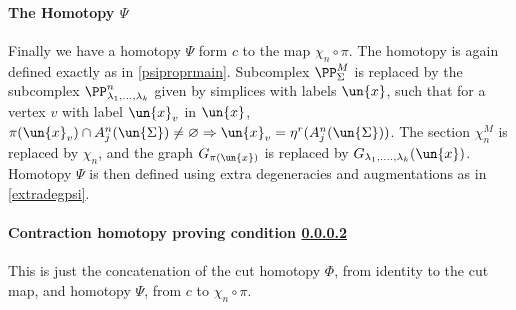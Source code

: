 \documentclass[a4paper,10pt]{amsart}
\begin{document}
%

	\paragraph{\textbf{The Homotopy $\Psi$}} 
	Finally we have a homotopy $\Psi$ form $c$ to the map $\chi_n \circ \pi$. The homotopy is again defined exactly as in \ref{psiproprmain}. Subcomplex $\PP_{\Sigma}^M$ is replaced by the subcomplex $\PP_{\lambda_1,...,\lambda_k}^n$ given by simplices with labels $\un{x}$, such that for a vertex $v$ with label $\un{x}_v$ in $\un{x}$, $\pi(\un{x}_v) \cap A^n_j(\un{\Sigma}) \neq \varnothing \Rightarrow \un{x}_v = \eta^r( A^n_j(\un{\Sigma}))$. The section $\chi^M_n$ is replaced by $\chi_n$, and the graph $G_{\pi(\un{x})}$ is replaced by $G_{\lambda_1,....,\lambda_k}(\un{x})$. Homotopy $\Psi$ is then defined using extra degeneracies and augmentations as in \ref{extradegpsi}.

	\paragraph{Contraction homotopy proving condition \ref{}}  This is just the concatenation of the cut homotopy $\Phi$, from identity to the cut map, and homotopy $\Psi$, from $c$ to $\chi_n\circ \pi$.
	
\end{document}
